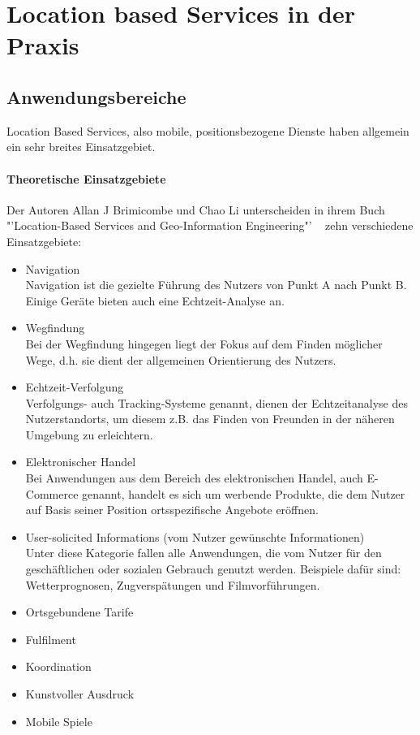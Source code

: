 \section{Location based Services in der Praxis}
	\subsection{Anwendungsbereiche}
Location Based Services, also mobile, positionsbezogene Dienste haben allgemein ein sehr breites Einsatzgebiet.\\
\paragraph{Theoretische Einsatzgebiete}
Der Autoren Allan J Brimicombe und Chao Li unterscheiden in ihrem Buch "'Location-Based Services and Geo-Information Engineering"' ~\cite[S.132]{brimicombe_li:application_area} zehn verschiedene Einsatzgebiete:
\begin{itemize}
	\item Navigation\\
Navigation ist die gezielte Führung des Nutzers von Punkt A nach Punkt B. Einige Geräte bieten auch eine Echtzeit-Analyse an.
	\item Wegfindung\\
Bei der Wegfindung hingegen liegt der Fokus auf dem Finden möglicher Wege, d.h. sie dient der allgemeinen Orientierung des Nutzers.
	\item Echtzeit-Verfolgung\\
Verfolgungs- auch Tracking-Systeme genannt, dienen der Echtzeitanalyse des Nutzerstandorts, um diesem z.B. das Finden von Freunden in der näheren Umgebung zu erleichtern.
	\item Elektronischer Handel\\
Bei Anwendungen aus dem Bereich des elektronischen Handel, auch E-Commerce genannt, handelt es sich um werbende Produkte, die dem Nutzer auf Basis seiner Position ortsspezifische Angebote eröffnen.
	\item User-solicited Informations (vom Nutzer gewünschte Informationen)\\
Unter diese Kategorie fallen alle Anwendungen, die vom Nutzer für den geschäftlichen oder sozialen Gebrauch genutzt werden. Beispiele dafür sind: Wetterprognosen, Zugverspätungen und Filmvorführungen.
	\item Ortsgebundene Tarife
	\item Fulfilment
	\item Koordination
	\item Kunstvoller Ausdruck
	\item Mobile Spiele
\end{itemize}

